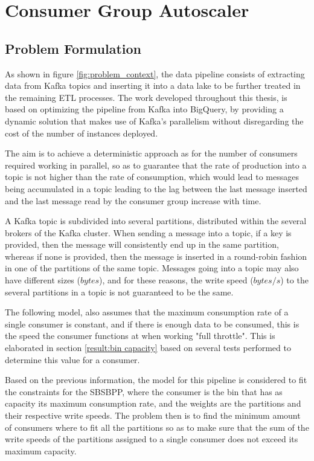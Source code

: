 \chapter{Consumer Group Autoscaler} \label{chap:consumer_group_autoscaler}

\section{Problem Formulation}

As shown in figure \ref{fig:problem_context}, the data pipeline consists of
extracting data from Kafka topics and inserting it into a data lake to be
further treated in the remaining ETL processes.  The work developed throughout
this thesis, is based on optimizing the pipeline from Kafka into BigQuery, by
providing a dynamic solution that makes use of Kafka's parallelism without
disregarding the cost of the number of instances deployed. 

The aim is to achieve a deterministic approach as for the number of consumers
required working in parallel, so as to guarantee that the rate of production
into a topic is not higher than the rate of consumption, which would lead to
messages being accumulated in a topic leading to the lag between the last
message inserted and the last message read by the consumer group increase with
time.

A Kafka topic is subdivided into several partitions, distributed within the
several brokers of the Kafka cluster. When sending a message into a topic, if a
key is provided, then the message will consistently end up in the same
partition, whereas if none is provided, then the message is inserted in a
round-robin fashion in one of the partitions of the same topic. Messages going
into a topic may also have different sizes ($bytes$), and for these reasons, the
write speed ($bytes/s$) to the several partitions in a topic is not guaranteed
to be the same. 

The following model, also assumes that the maximum consumption rate of a single
consumer is constant, and if there is enough data to be consumed, this is the
speed the consumer functions at when working "full throttle". This is
elaborated in section \ref{result:bin capacity} based on several tests performed
to determine this value for a consumer. 

Based on the previous information, the model for this pipeline is considered to
fit the constraints for the SBSBPP, where the consumer is the bin that has as
capacity its maximum consumption rate, and the weights are the partitions and
their respective write speeds. The problem then is to find the minimum amount of
consumers where to fit all the partitions so as to make sure that the sum of the
write speeds of the partitions assigned to a single consumer does not exceed its
maximum capacity. 

